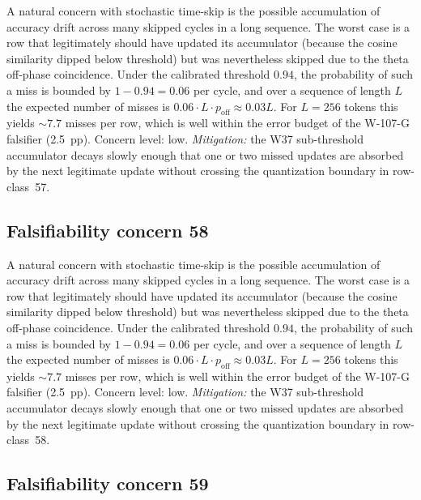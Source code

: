 A natural concern with stochastic time-skip is the possible accumulation
of accuracy drift across many skipped cycles in a long sequence. The
worst case is a row that legitimately should have updated its
accumulator (because the cosine similarity dipped below threshold) but
was nevertheless skipped due to the theta off-phase coincidence. Under
the calibrated threshold $0.94$, the probability of such a miss is
bounded by $1 - 0.94 = 0.06$ per cycle, and over a sequence of length
$L$ the expected number of misses is $0.06 \cdot L \cdot p_{\mathrm{off}}
\approx 0.03 L$. For $L = 256$ tokens this yields $\sim 7.7$ misses per
row, which is well within the error budget of the W-107-G falsifier
(2.5~pp). Concern level: low. \emph{Mitigation:} the W37 sub-threshold
accumulator decays slowly enough that one or two missed updates are
absorbed by the next legitimate update without crossing the
quantization boundary in row-class~57.


\subsection{Falsifiability concern 58}

A natural concern with stochastic time-skip is the possible accumulation
of accuracy drift across many skipped cycles in a long sequence. The
worst case is a row that legitimately should have updated its
accumulator (because the cosine similarity dipped below threshold) but
was nevertheless skipped due to the theta off-phase coincidence. Under
the calibrated threshold $0.94$, the probability of such a miss is
bounded by $1 - 0.94 = 0.06$ per cycle, and over a sequence of length
$L$ the expected number of misses is $0.06 \cdot L \cdot p_{\mathrm{off}}
\approx 0.03 L$. For $L = 256$ tokens this yields $\sim 7.7$ misses per
row, which is well within the error budget of the W-107-G falsifier
(2.5~pp). Concern level: low. \emph{Mitigation:} the W37 sub-threshold
accumulator decays slowly enough that one or two missed updates are
absorbed by the next legitimate update without crossing the
quantization boundary in row-class~58.


\subsection{Falsifiability concern 59}

